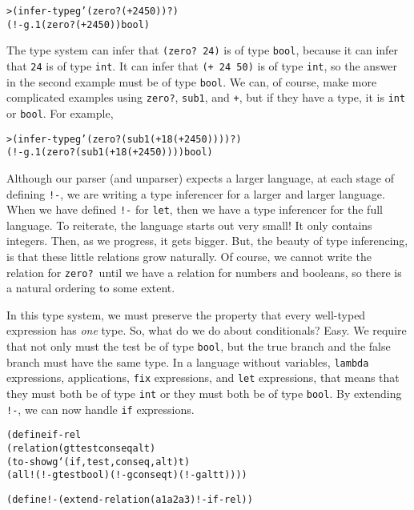 \begin{alltt}
> (infer-type g '(zero? (+ 24 50)) ?)
(!- g.1 (zero? (+ 24 50)) bool)
\end{alltt}

The type system can infer that \texttt{(zero? 24)} is of type
\texttt{bool}, because it can infer that \texttt{24} is of type
\texttt{int}.  It can infer that \texttt{(+ 24 50)} is of type
\texttt{int}, so the answer in the second example must be of type
\texttt{bool}.  We can, of course, make more complicated examples
using \texttt{zero?}, \texttt{sub1}, and \texttt{+}, but if they have
a type, it is \texttt{int} or \texttt{bool}.  For example,

\begin{alltt}
> (infer-type g '(zero? (sub1 (+ 18 (+ 24 50)))) ?)
(!- g.1 (zero? (sub1 (+ 18 (+ 24 50)))) bool)
\end{alltt}

Although our parser (and unparser) expects a larger language, at each
stage of defining \texttt{!-}, we are writing a type inferencer for a
larger and larger language.  When we have defined \texttt{!-} for
\texttt{let}, then we have a type inferencer for the full language.
To reiterate, the language starts out very small! It only contains
integers.  Then, as we progress, it gets bigger.  But, the beauty of
type inferencing, is that these little relations grow naturally.  Of
course, we cannot write the relation for \texttt{zero?}\ until we have
a relation for numbers and booleans, so there is a natural ordering to
some extent.

In this type system, we must preserve the property that every
well-typed expression has \emph{one} type.  So, what do we do about
conditionals?  Easy.  We require that not only must the test be of
type \texttt{bool}, but the true branch and the false branch must
have the same type.  In a language without variables, \texttt{lambda}
expressions, applications, \texttt{fix} expressions, and \texttt{let}
expressions, that means that they must both be of type \texttt{int}
or they must both be of type \texttt{bool}.  By extending
\texttt{!-}, we can now handle \texttt{if} expressions.

\begin{alltt}
(define if-rel
  (relation (g t test conseq alt)
    (to-show g `(if ,test ,conseq ,alt) t)
    (all! (!- g test bool) (!- g conseq t) (!- g alt t))))
\end{alltt}

\begin{alltt}
(define !- (extend-relation (a1 a2 a3) !- if-rel))
\end{alltt}


